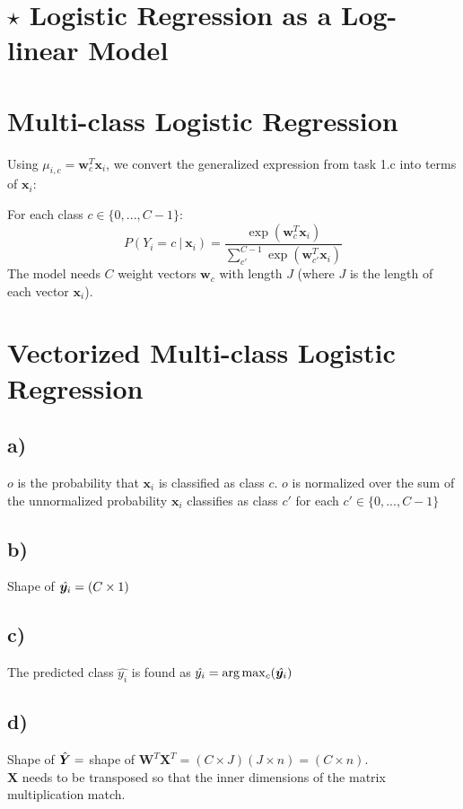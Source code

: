 \documentclass{article}
\renewcommand{\vec}[1]{%
	\bm{#1}%
}
\newcommand{\gv}{%
	\:|\:
}
\begin{document}
	\section{$\star$ Logistic Regression as a Log-linear Model}
	
	
	\section{Multi-class Logistic Regression}
	Using $\mu_{i,c} = \vec{w}_c^T\vec{x}_i$, we convert the generalized expression from task 1.c into terms of $\vec{x}_i$:\par
	For each class $c \in \{0,...,C-1\}:$
	\[ P(Y_i = c \gv \vec{x}_i) = \frac{\exp(\vec{w}_c^T\vec{x}_i)}{\sum_{c'}^{C-1} \exp(\vec{w}_{c'}^T\vec{x}_i)} \]
	The model needs $C$ weight vectors $\vec{w}_c$ with length $J$ (where $J$ is the length of each vector $\vec{x}_i$).
	
	\section{Vectorized Multi-class Logistic Regression}
	\subsection*{a)}
	\begin{outline}
		\1$o$ is the probability that $\vec{x}_i$ is classified as class $c$.
		\1$o$ is normalized over the sum of the unnormalized probability $\vec{x}_i$ classifies as class $c'$ for each $c' \in \{0,...,C-1\}$
	\end{outline}
	
	\subsection*{b)}
	Shape of $\hat{\vec{y}_i} = (C \times 1)$
	
	\subsection*{c)}
	The predicted class $\hat{y_i}$ is found as $\hat{y_i} = \arg\max_c(\hat{\vec{y}_i})$
	
	\subsection*{d)}
	Shape of $\hat{\vec{Y}} = $ shape of $\vec{W}^T\vec{X}^T = (C \times J)(J \times n) = \boxed{(C \times n)}$.\\
	$\vec{X}$ needs to be transposed so that the inner dimensions of the matrix multiplication match.
	
\end{document}
